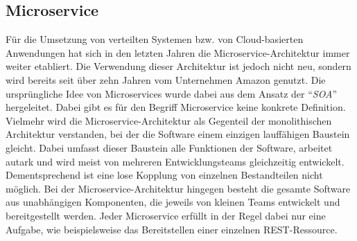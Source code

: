\subsection{Microservice}
\label{sec:grundlagen:microservices}

Für die Umsetzung von verteilten Systemen bzw. von Cloud-basierten Anwendungen hat sich in den letzten Jahren die Microservice-Architektur immer weiter etabliert.\autocite[Vgl.][Kapitel \enquote{Monolithic architecture overview}]{MS-Sharma.2016}
Die Verwendung dieser Architektur ist jedoch nicht neu, sondern wird bereits seit über zehn Jahren vom Unternehmen Amazon genutzt.\autocite[Vgl.][]{MS-Wolff.02.11.2015}
Die ursprüngliche Idee von Microservices wurde dabei aus dem Ansatz der \enquote{\textit{\ac{SOA}}} hergeleitet.\autocite[Vgl.][S. 1]{MS-Bucchiarone.2018}
Dabei gibt es für den Begriff Microservice keine konkrete Definition.\autocite[Vgl.][S. 3]{MS-Wolff.2018}
Vielmehr wird die Microservice-Architektur als Gegenteil der monolithischen Architektur verstanden, bei der die Software einem einzigen lauffähigen Baustein gleicht.
Dabei umfasst dieser Baustein alle Funktionen der Software, arbeitet autark und wird meist von mehreren Entwicklungsteams gleichzeitig entwickelt.
Dementsprechend ist eine lose Kopplung von einzelnen Bestandteilen nicht möglich.
Bei der Microservice-Architektur hingegen besteht die gesamte Software aus unabhängigen Komponenten, die jeweils von kleinen Teams entwickelt und bereitgestellt werden.\autocite[Vgl.][]{MS-Fowler.25.03.2014}
Jeder Microservice erfüllt in der Regel dabei nur eine Aufgabe, wie beispielsweise das Bereitstellen einer einzelnen \ac{REST}-Ressource.
